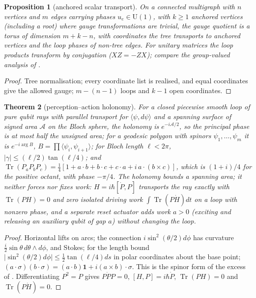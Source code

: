 \documentclass[aps,pra,onecolumn,superscriptaddress,nofootinbib,10pt]{revtex4-2}
\newtheorem{theorem}{Theorem}
\newtheorem{proposition}[theorem]{Proposition}
\theoremstyle{definition}
\theoremstyle{remark}
\newcommand{\tr}{\operatorname{Tr}}
\newcommand{\ip}[2]{\langle #1,#2\rangle}
\newcommand{\U}{\mathrm{U}}
\begin{document}
\begin{proposition}[anchored scalar transport]\label{prop:fmgraphphase}
On a connected multigraph with $n$ vertices and $m$ edges carrying phases $u_e\in\U(1)$, with $k\ge1$ anchored vertices
(including a root) where gauge transformations are trivial, the gauge quotient is a torus of dimension
$m+k-n$, with coordinates the tree transports to anchored vertices and the loop phases of non-tree edges.  For
unitary matrices the loop products transform by conjugation ($XZ=-ZX$); compare the group-valued
analysis of \cite[Sec.~0.4]{PaperI}.
\end{proposition}
\begin{proof}
Tree normalisation; every coordinate list is realised, and equal coordinates give the allowed gauge;
$m-(n-1)$ loops and $k-1$ open coordinates.
\end{proof}

\begin{theorem}[perception--action holonomy]\label{thm:fmberry}
For a closed piecewise smooth loop of pure qubit rays with parallel transport for $\ip\psi{d\psi}$ and a spanning
surface of signed area $\mathcal A$ on the Bloch sphere, the holonomy is $e^{-i\mathcal A/2}$, so the principal phase is at most half the
unsigned area; for a geodesic polygon with spinors $\psi_1,\dots,\psi_m$ it is $e^{-i\arg B}$, $B=\prod\ip{\psi_i}{\psi_{i+1}}$; for Bloch length $\ell<2\pi$,
$\lvert\gamma\rvert\le(\ell/2)\tan(\ell/4)$; and $\tr(P_aP_bP_c)=\tfrac14[1+a\cdot b+b\cdot c+c\cdot a+i\,a\cdot(b\times c)]$, which is $(1+i)/4$ for the positive octant,
with phase $-\pi/4$.  \emph{The holonomy bounds a spanning area; it neither forces nor fixes work}: $H=i\hbar[\dot P,P]$
transports the ray exactly with $\tr(PH)=0$ and zero isolated driving work $\int\tr(P\dot H)dt$ on a loop with
nonzero phase, and a separate reset actuator adds work $a>0$ (exciting and releasing an auxiliary qubit of
gap $a$) without changing the loop.
\end{theorem}
\begin{proof}
Horizontal lifts on arcs; the connection $i\sin^2(\theta/2)d\phi$ has curvature $\tfrac i2\sin\theta\,d\theta\wedge d\phi$, and Stokes; for the length bound
$\lvert\sin^2(\theta/2)d\phi\rvert\le\tfrac12\tan(\ell/4)ds$ in polar coordinates about the base point; $(a\cdot\sigma)(b\cdot\sigma)=(a\cdot b)\mathbf1+i(a\times b)\cdot\sigma$.  This is the
spinor form of the excess of \cite[Thm.~9.9, Cor.~9.11]{PaperI}
\cite{n2-pancharatnam,n2-berry,n2-simon,n2-sb}.  Differentiating $P^2=P$ gives $P\dot PP=0$, $[H,P]=i\hbar\dot P$, $\tr(PH)=0$ and
$\tr(P\dot H)=0$.
\end{proof}
\end{document}

